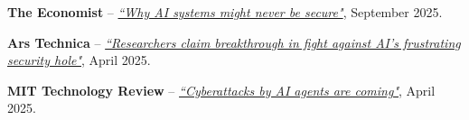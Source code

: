 
\begin{cvparagraph}
\vspace{5.0mm}
\begin{cvitems} %
    \item{\textbf{The Economist} -- \textit{\href{https://www.economist.com/science-and-technology/2025/09/22/why-ai-systems-might-never-be-secure}{``Why AI systems might never be secure"}}, September 2025.}
    \item{\textbf{Ars Technica} -- \textit{\href{https://arstechnica.com/information-technology/2025/04/researchers-claim-breakthrough-in-fight-against-ais-frustrating-security-hole/}{``Researchers claim breakthrough in fight against AI's frustrating security hole"}}, April 2025.}
    \item{\textbf{MIT Technology Review} -- \textit{\href{https://www.technologyreview.com/2025/04/04/1114228/cyberattacks-by-ai-agents-are-coming/}{``Cyberattacks by AI agents are coming"}}, April 2025.}
\end{cvitems}
\end{cvparagraph}
